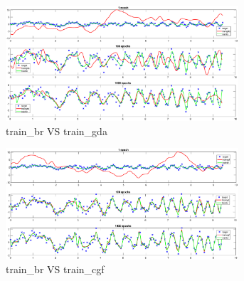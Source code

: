 \begin{figure}[!htpb]
	\begin{subfigure}[b]{0.5\textwidth}
		\centering
		\captionsetup{ width=0.8\linewidth, format = hang}
		\includegraphics[height = 0.7\textwidth, width = 0.95\textwidth]{Exercise1/Report/train_br_gda}
		\caption{train\_br VS train\_gda}\label{fig:train_br_gda}
	\end{subfigure}%
	\begin{subfigure}[b]{0.5\textwidth}
		\centering
		\captionsetup{width=0.8\linewidth, format = hang}
		\includegraphics[height = 0.7\textwidth, width = 0.95\textwidth]{Exercise1/Report/train_br_cgf}
		\caption{train\_br VS  train\_cgf}\label{fig:train_br_cgf}
	\end{subfigure}
	\begin{subfigure}[b]{0.5\textwidth}

\end{subfigure}
\end{figure}
